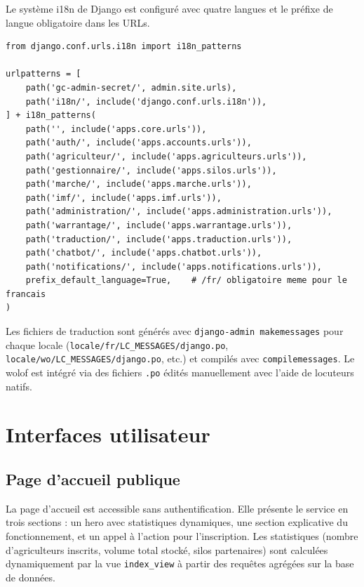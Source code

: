 \documentclass[12pt,a4paper,twoside]{report}
\begin{document}
Le système i18n de Django est configuré avec quatre langues et le préfixe
de langue obligatoire dans les URLs.

\begin{lstlisting}[style=pythonstyle, caption={Configuration i18n (\texttt{config/urls.py})}]
from django.conf.urls.i18n import i18n_patterns

urlpatterns = [
    path('gc-admin-secret/', admin.site.urls),
    path('i18n/', include('django.conf.urls.i18n')),
] + i18n_patterns(
    path('', include('apps.core.urls')),
    path('auth/', include('apps.accounts.urls')),
    path('agriculteur/', include('apps.agriculteurs.urls')),
    path('gestionnaire/', include('apps.silos.urls')),
    path('marche/', include('apps.marche.urls')),
    path('imf/', include('apps.imf.urls')),
    path('administration/', include('apps.administration.urls')),
    path('warrantage/', include('apps.warrantage.urls')),
    path('traduction/', include('apps.traduction.urls')),
    path('chatbot/', include('apps.chatbot.urls')),
    path('notifications/', include('apps.notifications.urls')),
    prefix_default_language=True,    # /fr/ obligatoire meme pour le francais
)
\end{lstlisting}

Les fichiers de traduction sont générés avec \texttt{django-admin makemessages}
pour chaque locale (\texttt{locale/fr/LC\_MESSAGES/django.po},
\texttt{locale/wo/LC\_MESSAGES/django.po}, etc.) et compilés avec
\texttt{compilemessages}. Le wolof est intégré via des fichiers \texttt{.po}
édités manuellement avec l'aide de locuteurs natifs.

\chapter{Interfaces utilisateur}

\section{Page d'accueil publique}

La page d'accueil est accessible sans authentification. Elle présente le
service en trois sections : un hero avec statistiques dynamiques, une
section explicative du fonctionnement, et un appel à l'action pour
l'inscription. Les statistiques (nombre d'agriculteurs inscrits, volume
total stocké, silos partenaires) sont calculées dynamiquement par la vue
\texttt{index\_view} à partir des requêtes agrégées sur la base de données.
\end{document}
